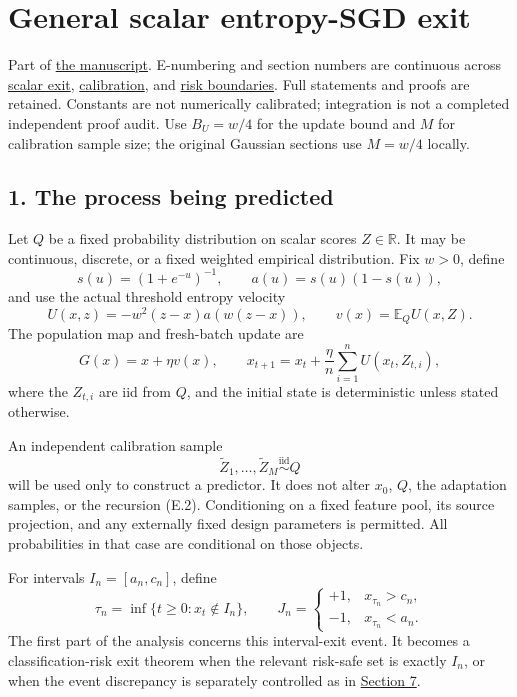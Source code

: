 \section{General scalar entropy-SGD
exit}\label{scalar_exit-general-scalar-entropy-sgd-exit}

Part of \href{DRAFT.md}{the manuscript}. E-numbering and section numbers
are continuous across \href{scalar_exit.md}{scalar exit},
\href{calibration.md}{calibration}, and \href{risk_boundaries.md}{risk
boundaries}. Full statements and proofs are retained. Constants are not
numerically calibrated; integration is not a completed independent proof
audit. Use \(B_U=w/4\) for the update bound and \(M\) for calibration
sample size; the original Gaussian sections use \(M=w/4\) locally.

\subsection{1. The process being
predicted}\label{scalar_exit-the-process-being-predicted}

Let \(Q\) be a fixed probability distribution on scalar scores
\(Z\in\mathbb R\). It may be continuous, discrete, or a fixed weighted
empirical distribution. Fix \(w>0\), define \[
s(u)=(1+e^{-u})^{-1},\qquad a(u)=s(u)(1-s(u)),
\] and use the actual threshold entropy velocity \[
U(x,z)=-w^2(z-x)a(w(z-x)),\qquad
v(x)=\mathbb E_Q U(x,Z).
\tag{E.1}
\] The population map and fresh-batch update are \[
G(x)=x+\eta v(x),\qquad
x_{t+1}=x_t+\frac{\eta}{n}\sum_{i=1}^n U(x_t,Z_{t,i}),
\tag{E.2}
\] where the \(Z_{t,i}\) are iid from \(Q\), and the initial state is
deterministic unless stated otherwise.

An independent calibration sample \[
\widetilde Z_1,\ldots,\widetilde Z_M\overset{\mathrm{iid}}{\sim}Q
\tag{E.3}
\] will be used only to construct a predictor. It does not alter
\(x_0\), \(Q\), the adaptation samples, or the recursion (E.2).
Conditioning on a fixed feature pool, its source projection, and any
externally fixed design parameters is permitted. All probabilities in
that case are conditional on those objects.

For intervals \(I_n=[a_n,c_n]\), define \[
\tau_n=\inf\{t\ge0:x_t\notin I_n\},\qquad
J_n=\begin{cases}+1,&x_{\tau_n}>c_n,\\-1,&x_{\tau_n}<a_n.\end{cases}
\tag{E.4}
\] The first part of the analysis concerns this interval-exit event. It
becomes a classification-risk exit theorem when the relevant risk-safe
set is exactly \(I_n\), or when the event discrepancy is separately
controlled as in \href{risk_boundaries.md}{Section 7}.

